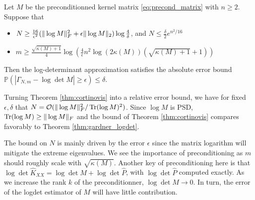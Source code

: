 \documentclass{article}
\begin{document}
{\begin{theorem} \label{thm:cortinovis}
Let $M$ be the preconditionned kernel matrix \eqref{eq:precond_matrix} with $n \ge 2$. Suppose that 
\begin{itemize}
    \item $N \ge \frac{16}{\epsilon^2} (\Vert \log M \Vert_F^2 + \epsilon \Vert \log M \Vert_2) \log\frac{4}{\delta}$, and $N \le \frac{\delta}{2} e^{n^2/16}$
    \item $m \ge \frac{\sqrt{\kappa(M) + 1}}{4} \log\left( \frac{4}{\epsilon} n^2 \log(2\kappa(M)) (\sqrt{\kappa(M) + 1} + 1) \right)$
\end{itemize}
Then the log-determinant approximation satisfies the absolute error bound $\mathbb P( | \Gamma_{N, m} - \log\det M | \ge \epsilon) \le \delta$.
\end{theorem}

\begin{observation}
Turning Theorem \ref{thm:cortinovis} into a relative error bound, we have for fixed $\epsilon, \delta$ that $N = \mathcal O(\Vert \log M \Vert_F^2 / \operatorname{Tr}(\log M)^2)$. Since $\log M$ is PSD, $\operatorname{Tr}(\log M) \ge \Vert \log M \Vert_F$ and the bound of Theorem \ref{thm:cortinovis} compares favorably to Theorem \ref{thm:gardner_logdet}.
\end{observation}

\begin{observation}
The bound on $N$ is mainly driven by the error $\epsilon$ since the matrix logarithm will mitigate the extreme eigenvalues. We see the importance of preconditioning as $m$ should roughly scale with $\sqrt{\kappa(M)}$. 
Another key of preconditioning here is that $\log\det \widehat K_{XX} = \log\det M + \log\det \widehat P$, with $\log\det \widehat P$ computed exactly. As we increase the rank $k$ of the preconditionner, $\log\det M \to 0$. In turn, the error of the logdet estimator of $M$ will have little contribution.


\end{observation}}
\end{document}
